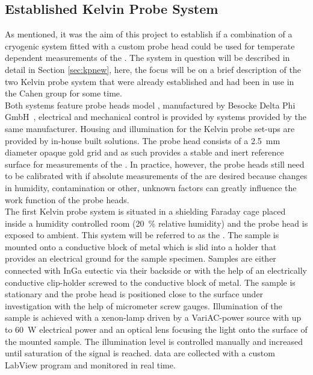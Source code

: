 \subsection{Established Kelvin Probe System}
\label{sec:kppold}
As mentioned, it was the aim of this project to establish if a combination of a cryogenic system fitted with a custom \kp{} probe head could be used for temperate dependent measurements of the \spv{}. The system in question will be described in detail in Section \ref{sec:kpnew}, here, the focus will be on a brief description of the two Kelvin probe system that were already established and had been in use in the Cahen group for some time.\\
Both systems feature \kp{} probe heads model , manufactured by Besocke Delta Phi GmbH~\cite{besocke}, electrical and mechanical control is provided by systems provided by the same manufacturer. Housing and illumination for the Kelvin probe set-ups are provided by in-house built solutions. The probe head consists of a \SI{2.5}{\milli\metre} diameter opaque gold grid and as such provides a stable and inert reference surface for measurements of the \cpd{}. In practice, however, the probe heads still need to be calibrated with \hopg{} if absolute measurements of the \wf{} are desired because changes in humidity, contamination or other, unknown factors can greatly influence the work function of the probe heads.\\
The first Kelvin probe system is situated in a shielding Faraday cage placed inside a humidity controlled room (\SI{20}{\percent} relative humidity) and the probe head is exposed to ambient. This system will be referred to as the . The sample is mounted onto a conductive block of metal which is slid into a holder that provides an electrical ground for the sample specimen. Samples are either connected with InGa eutectic via their backside or with the help of an electrically conductive clip-holder screwed to the conductive block of metal. The sample is stationary and the probe head is positioned close to the surface under investigation with the help of micrometer screw gauges. Illumination of the sample is achieved with a xenon-lamp driven by a VariAC-power source with up to \SI{60}{\watt} electrical power and an optical lens focusing the light onto the surface of the mounted sample. The illumination level is controlled manually and increased until saturation of the \spv{} signal is reached. \cpd{} data are collected with a custom LabView program and monitored in real time.\\
